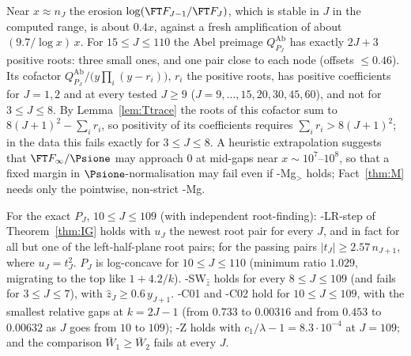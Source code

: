 \begin{observation}\label{obs:front}
Near $x\approx n_J$ the erosion $\log(\FT F_{J-1}/\FT F_J)$, which is stable in $J$ in the computed range, is about $0.4x$, against a fresh amplification of
about $(9.7/\log x)\,x$. For $15\le J\le110$ the Abel preimage $Q^{\mathrm{Ab}}_{P_J}$ has exactly $2J+3$ positive roots: three
small ones, and one pair close to each node (offsets $\le0.46$). Its cofactor
$Q^{\mathrm{Ab}}_{P_J}/\bigl(y\prod_i(y-r_i)\bigr)$, $r_i$ the positive roots, has positive coefficients for $J=1,2$ and at
every tested $J\ge9$ ($J=9,\dots,15,20,30,45,60$), and not for $3\le J\le8$. By Lemma~\ref{lem:Ttrace} the roots of this
cofactor sum to $8(J+1)^2-\sum_ir_i$, so positivity of its coefficients requires $\sum_ir_i>8(J+1)^2$; in the data this
fails exactly for $3\le J\le8$. A heuristic extrapolation suggests that $\FT F_\infty/\Psione$ may approach $0$ at mid-gaps near
$x\sim10^7$--$10^8$, so that a fixed margin in $\Psione$-normalisation may fail even if \hyp{Mg$_>$} holds; Fact~\ref{thm:M}
needs only the pointwise, non-strict \hyp{Mg}.
\end{observation}

\begin{observation}\label{obs:LRstep}
For the exact $P_J$, $10\le J\le109$ (with independent root-finding): \hyp{LR-step} of Theorem~\ref{thm:IG} holds with $u_J$
the newest root pair for every $J$, and in fact for all but one of the left-half-plane root pairs; for the passing pairs
$\lvert t_J\rvert\ge2.57\,n_{J+1}$, where $u_J=t_J^2$. $P_J$ is log-concave for $10\le J\le110$ (minimum ratio $1.029$,
migrating to the top like $1+4.2/k$). \hyp{SW$_{\hat z}$} holds for every $8\le J\le109$ (and fails for $3\le J\le7$), with
$\hat z_J\ge0.6\,y_{J+1}$. \hyp{C01} and \hyp{C02} hold for $10\le J\le109$, with the smallest relative gaps at $k=2J-1$
(from $0.733$ to $0.00316$ and from $0.453$ to $0.00632$ as $J$ goes from $10$ to $109$); \hyp{Z} holds with
$c_1/\lambda-1=8.3\cdot10^{-4}$ at $J=109$; and the comparison $\bar W_1\ge\bar W_2$ fails at every $J$.
\end{observation}

